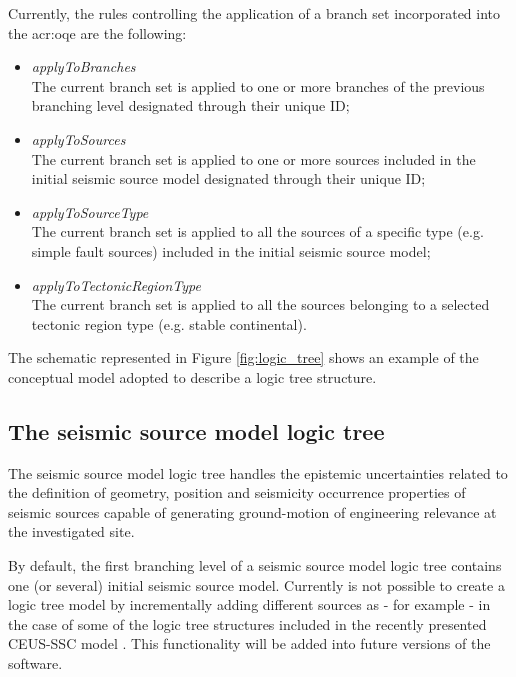 Currently, the rules controlling the application of a branch set 
incorporated into the \gls{acr:oqe} are the following:
\begin{itemize}
    \item \emph{applyToBranches} \hfill \\
        The current branch set is applied to one or more branches 
        of the previous branching level designated through their 
        unique ID;
    \item \emph{applyToSources} \hfill \\
        The current branch set is applied to one or more sources 
        included in the initial seismic source model designated 
        through their unique ID;
    \item \emph{applyToSourceType} \hfill \\
        The current branch set is applied to all the sources of a 
        specific type (e.g. simple fault sources) included in the 
        initial seismic source model;
    \item \emph{applyToTectonicRegionType} \hfill \\
        The current branch set is applied to all the sources belonging 
        to a selected tectonic region type (e.g. stable continental).
\end{itemize}
%
The schematic represented in Figure \ref{fig:logic_tree} shows an example of 
the conceptual model adopted to describe a logic tree structure. 
%
\subsection{The seismic source model logic tree}
The seismic source model logic tree handles the epistemic uncertainties
related to the definition of geometry, position and seismicity occurrence 
properties of seismic sources capable of generating ground-motion of 
engineering relevance at the investigated site. 

By default, the first branching level of a seismic source model logic tree 
contains one (or several) initial seismic source model. 
%
Currently is not possible to create a logic tree model by 
incrementally adding different sources as - for example - in the case of 
some of the logic tree structures included in the recently presented 
CEUS-SSC model \parencite{ceus2012}. 
%
This functionality will be added into future versions of the software.
%
